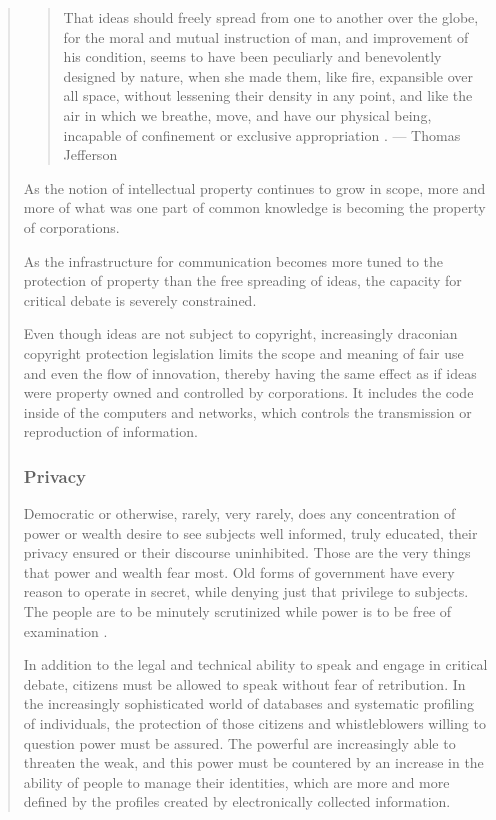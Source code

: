 \begin{quote}
\begin{quotation}
That ideas should freely spread from one to another over the globe, for the moral and mutual instruction of man, and improvement of his condition, seems to have been peculiarly and benevolently designed by nature, when she made them, like fire, expansible over all space, without lessening their density in any point, and like the air in which we breathe, move, and have our physical being, incapable of confinement or exclusive appropriation \cite{jefferson1813letter}.
--- Thomas Jefferson
\end{quotation}

As the notion of intellectual property continues to grow in scope, more and more of what was one part of common knowledge is becoming the property of corporations.

As the infrastructure for communication becomes more tuned to the protection of property than the free spreading of ideas, the capacity for critical debate is severely constrained.

Even though ideas are not subject to copyright, increasingly draconian copyright protection legislation limits the scope and meaning of fair use and even the flow of innovation, thereby having the same effect as if ideas were property owned and controlled by corporations. It includes the code inside of the computers and networks, which controls the transmission or reproduction of information.

\subsubsection{Privacy}

Democratic or otherwise, rarely, very rarely, does any concentration of power or wealth desire to see subjects well informed, truly educated, their privacy ensured or their discourse uninhibited. Those are the very things that power and wealth fear most. Old forms of government have every reason to operate in secret, while denying just that privilege to subjects. The people are to be minutely scrutinized while power is to be free of examination \cite{deehockjoiitoweb}.

In addition to the legal and technical ability to speak and engage in critical debate, citizens must be allowed to speak without fear of retribution. In the increasingly sophisticated world of databases and systematic profiling of individuals, the protection of those citizens and whistleblowers willing to question power must be assured. The powerful are increasingly able to threaten the weak, and this power must be countered by an increase in the ability of people to manage their identities, which are more and more defined by the profiles created by electronically collected information.


\end{quote}
